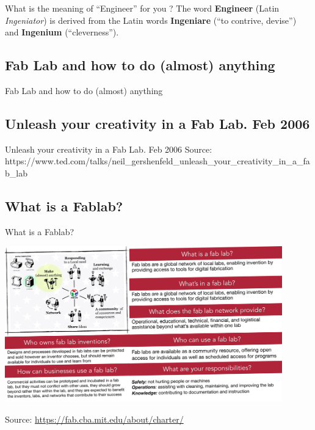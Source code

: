 \documentclass[
  ignorenonframetext,
  aspectratio=169,
  c]{beamer}
\begin{document}
\begin{frame}{What is the meaning of ``Engineer'' for you ?}
The word \textbf{Engineer} (Latin \emph{Ingeniator}) is derived from the
Latin words \textbf{Ingeniare} (``to contrive, devise'') and
\textbf{Ingenium} (``cleverness'').
\end{frame}

\subsection{Fab Lab and how to do (almost)
anything}\label{fab-lab-and-how-to-do-almost-anything}

\begin{frame}{Fab Lab and how to do (almost) anything}
\end{frame}

\subsection{Unleash your creativity in a Fab Lab. Feb
2006}\label{unleash-your-creativity-in-a-fab-lab.-feb-2006}

\begin{frame}{Unleash your creativity in a Fab Lab. Feb 2006}
Source:
https://www.ted.com/talks/neil\_gershenfeld\_unleash\_your\_creativity\_in\_a\_fab\_lab
\end{frame}

\subsection{What is a Fablab?}\label{what-is-a-fablab}

\begin{frame}{What is a Fablab?}
\begin{center}
\includegraphics[width=0.9\textwidth,height=\textheight]{figures/Fablab-definition-00.jpg}
\end{center}

Source: \url{https://fab.cba.mit.edu/about/charter/}
\end{frame}
\end{document}
